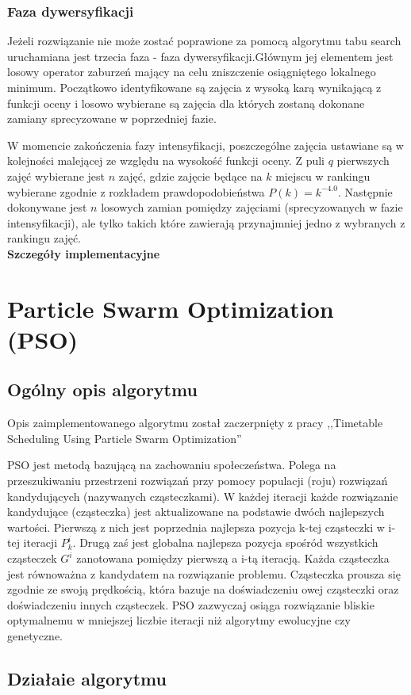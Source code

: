 \documentclass[11pt]{report}
\begin{document}
\subsubsection{Faza dywersyfikacji}
\par Jeżeli rozwiązanie nie może zostać poprawione za pomocą algorytmu tabu search uruchamiana jest trzecia faza - faza dywersyfikacji.Głównym jej elementem jest losowy operator zaburzeń mający na celu zniszczenie osiągniętego lokalnego minimum. Początkowo identyfikowane są zajęcia z wysoką karą wynikającą z funkcji oceny  i losowo wybierane są zajęcia dla których zostaną dokonane zamiany sprecyzowane w poprzedniej fazie.
\par W momencie zakończenia fazy intensyfikacji, poszczególne zajęcia ustawiane są w kolejności malejącej ze względu na wysokość funkcji oceny. Z puli $q$ pierwszych zajęć wybierane jest $n$ zajęć, gdzie zajęcie będące na $k$ miejscu w rankingu wybierane zgodnie z rozkładem prawdopodobieństwa $P(k) = k^{-4.0}$. Następnie dokonywane jest $n$ losowych zamian pomiędzy zajęciami (sprecyzowanych w fazie intensyfikacji), ale tylko takich które zawierają przynajmniej jedno z wybranych z rankingu zajęć. \\
\textbf{Szczegóły implementacyjne}
\section{Particle Swarm Optimization (PSO)}
\subsection{Ogólny opis algorytmu}
\par Opis zaimplementowanego algorytmu został zaczerpnięty z pracy ,,Timetable Scheduling Using Particle Swarm Optimization'' \cite{pso}
\par PSO jest metodą bazującą na zachowaniu społeczeństwa. Polega na przeszukiwaniu przestrzeni rozwiązań przy pomocy populacji (roju) rozwiązań kandydujących (nazywanych cząsteczkami). W każdej iteracji każde rozwiązanie kandydujące (cząsteczka) jest aktualizowane na podstawie dwóch najlepszych wartości. Pierwszą z nich jest poprzednia najlepsza pozycja k-tej cząsteczki w i-tej iteracji ${P}^{i}_{k}$. Drugą zaś jest globalna najlepsza pozycja spośród wszystkich cząsteczek ${G}^{i}$ zanotowana pomiędzy pierwszą a i-tą iteracją. Każda cząsteczka jest równoważna z kandydatem na rozwiązanie problemu. Cząsteczka prousza się zgodnie ze swoją prędkością, która bazuje na doświadczeniu owej cząsteczki oraz doświadczeniu innych cząsteczek. PSO zazwyczaj osiąga rozwiązanie bliskie optymalnemu w mniejszej liczbie iteracji niż algorytmy ewolucyjne czy genetyczne.  \subsection{Działaie algorytmu}
\end{document}
